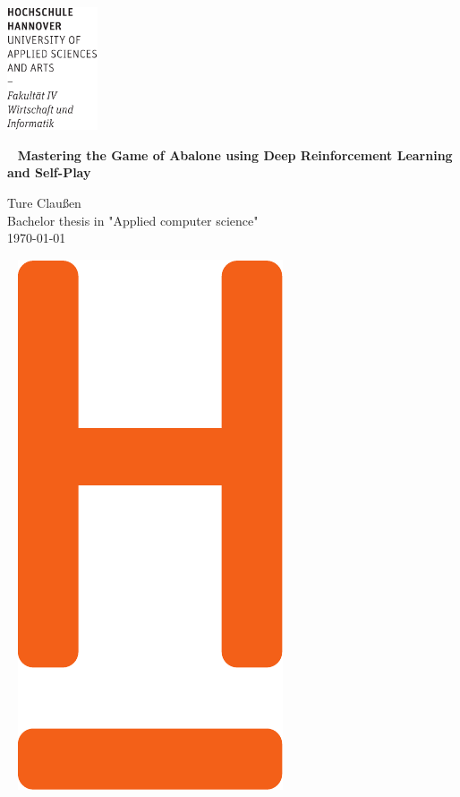 \documentclass[fontsize=12pt,paper=a4,twoside,parskip=half-,headsepline,headinclude, abstract=on]{scrreprt}
\begin{document}
\thispagestyle{empty}
\includegraphics[width=0.2\textwidth]{../lib/Wortmarke_WI_schwarz}

{  ~ \sffamily
    \vfill
    {\Huge\bfseries Mastering the Game of Abalone using Deep Reinforcement Learning and Self-Play}
    \bigskip

    {\Large
        Ture Claußen \\[2ex]
        Bachelor thesis in "Applied computer science"
        \\[5ex]
        \today }
}
\vfill

~ \hfill
\includegraphics[height=0.3\paperheight]{../lib/H_WI_Pantone1665}

\vspace*{-3cm}
\end{document}
